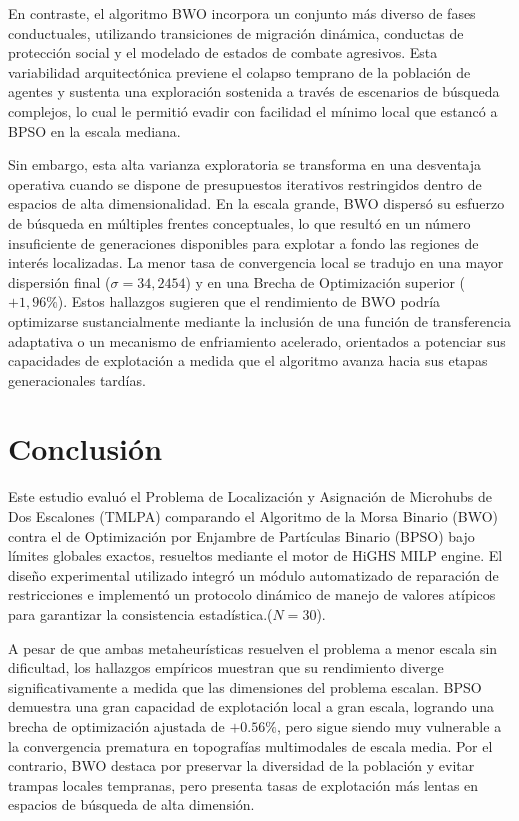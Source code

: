 \documentclass[final,5p,times,twocolumn]{elsarticle}
\begin{document}
En contraste, el algoritmo BWO incorpora un conjunto más diverso de fases conductuales, utilizando transiciones de migración dinámica, conductas de protección social y el modelado de estados de combate agresivos. Esta variabilidad arquitectónica previene el colapso temprano de la población de agentes y sustenta una exploración sostenida a través de escenarios de búsqueda complejos, lo cual le permitió evadir con facilidad el mínimo local que estancó a BPSO en la escala mediana.

Sin embargo, esta alta varianza exploratoria se transforma en una desventaja operativa cuando se dispone de presupuestos iterativos restringidos dentro de espacios de alta dimensionalidad. En la escala grande, BWO dispersó su esfuerzo de búsqueda en múltiples frentes conceptuales, lo que resultó en un número insuficiente de generaciones disponibles para explotar a fondo las regiones de interés localizadas. La menor tasa de convergencia local se tradujo en una mayor dispersión final ($\sigma = 34,2454$) y en una Brecha de Optimización superior ($+1,96\%$). Estos hallazgos sugieren que el rendimiento de BWO podría optimizarse sustancialmente mediante la inclusión de una función de transferencia adaptativa o un mecanismo de enfriamiento acelerado, orientados a potenciar sus capacidades de explotación a medida que el algoritmo avanza hacia sus etapas generacionales tardías.

\section{Conclusión}
\label{sec:conclusion}
Este estudio evaluó el Problema de Localización y Asignación de Microhubs de Dos Escalones (TMLPA) comparando el Algoritmo de la Morsa Binario (BWO) contra el de Optimización por Enjambre de Partículas Binario (BPSO) bajo límites globales exactos, resueltos mediante el motor de HiGHS MILP engine. El diseño experimental utilizado integró un módulo automatizado de reparación de restricciones e implementó un protocolo dinámico de manejo de valores atípicos para garantizar la consistencia estadística.($N=30$). 

A pesar de que ambas metaheurísticas resuelven el problema a menor escala sin dificultad, los hallazgos empíricos muestran que su rendimiento diverge significativamente a medida que las dimensiones del problema escalan. BPSO demuestra una gran capacidad de explotación local a gran escala, logrando una brecha de optimización ajustada de $+0.56\%$, pero sigue siendo muy vulnerable a la convergencia prematura en topografías multimodales de escala media. Por el contrario, BWO destaca por preservar la diversidad de la población y evitar trampas locales tempranas, pero presenta tasas de explotación más lentas en espacios de búsqueda de alta dimensión. 


\end{document}
